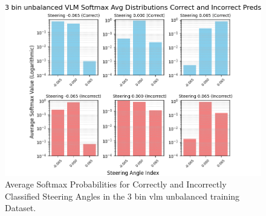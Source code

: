 \begin{figure}[H]
    \centering
    \includegraphics[width=1\linewidth]{Figures/Results/3_bins_vlm_softmax_dist_plot_unbalanced.png}
    \caption{Average Softmax Probabilities for Correctly and Incorrectly Classified Steering Angles in the 3 bin vlm unbalanced training Dataset.}
    \label{fig:3_bins_vlm_softmax_dist_unbalanced}
\end{figure}







